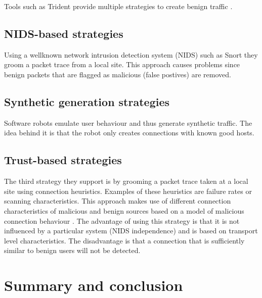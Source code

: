\documentclass[conference]{IEEEtran}
\begin{document}
Tools such as Trident provide multiple strategies to create benign traffic \cite{b10}. 

\subsection{NIDS-based strategies}
Using a wellknown network intrusion detection system (NIDS) such as Snort they groom a packet trace from a local site. This approach causes problems since benign packets that are flagged as malicious (false postives) are removed.

\subsection{Synthetic generation strategies}
Software robots emulate user behaviour and thus generate synthetic traffic. The idea behind it is that the robot only creates connections with known good hosts. 

\subsection{Trust-based strategies}
The third strategy they support is by grooming a packet trace taken at a local site using connection heuristics. Examples of these heuristics are failure rates or scanning characteristics. This approach makes use of different connection characteristics of malicious and benign sources based on a model of malicious connection behaviour \cite{b10}.
The advantage of using this strategy is that it is not influenced by a particular system (NIDS independence) and is based on transport level characteristics. The disadvantage is that a connection that is sufficiently similar to benign users will not be detected.



\section{Summary and conclusion}
\end{document}
